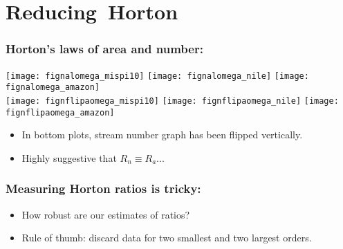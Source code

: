 
\section{Reducing\ Horton}

\begin{frame}[label=]
  \frametitle{Horton's laws of area and number:}

  \begin{block}{}
    \begin{center}
      \texttt{[image: fignalomega\_mispi10]} 
      \texttt{[image: fignalomega\_nile]} 
      \texttt{[image: fignalomega\_amazon]} \\
      \texttt{[image: fignflipaomega\_mispi10]} 
      \texttt{[image: fignflipaomega\_nile]} 
      \texttt{[image: fignflipaomega\_amazon]} 
    \end{center}
    \begin{itemize}
    \item<1-> 
       In bottom plots, stream number graph has been flipped vertically.
    \item<+-> 
      Highly suggestive that $R_n \equiv R_a$...
    \end{itemize}
  \end{block}

\end{frame}

\begin{frame}[label=]
  \frametitle{Measuring Horton ratios is tricky:}
  
  \begin{itemize}
  \item<1-> How robust are our estimates of ratios?
  \item<2-> Rule of thumb: discard data for two smallest
    and two largest orders.
  \end{itemize}

\end{frame}

